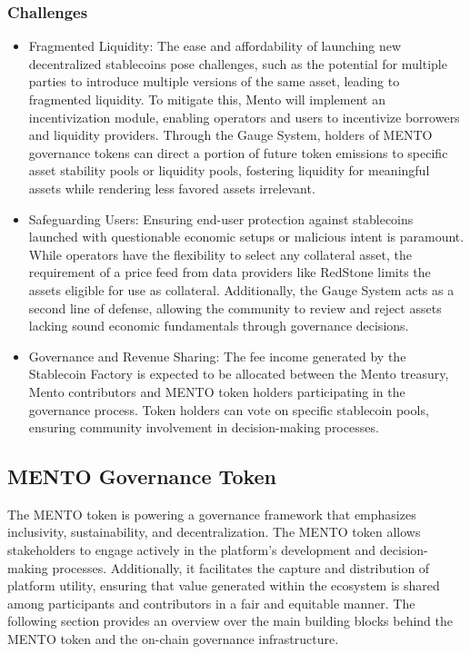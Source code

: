 \documentclass[a4paper]{article}
\theoremstyle{definition}
\begin{document}
\subsubsection{Challenges}
\begin{itemize}
    \item Fragmented Liquidity: The ease and affordability of launching new decentralized stablecoins pose challenges, such as the potential for multiple parties to introduce multiple versions of the same asset, leading to fragmented liquidity. To mitigate this, Mento will implement an incentivization module, enabling operators and users to incentivize borrowers and liquidity providers. Through the Gauge System, holders of MENTO governance tokens can direct a portion of future token emissions to specific asset stability pools or liquidity pools, fostering liquidity for meaningful assets while rendering less favored 
    assets irrelevant.
    \item Safeguarding Users: Ensuring end-user protection against stablecoins launched with questionable economic setups or malicious intent is paramount. While operators have the flexibility to select any collateral asset, the requirement of a price feed from data providers like RedStone limits the assets eligible for use as collateral. Additionally, the Gauge System acts as a second line of defense, allowing the community to review and reject assets lacking sound economic fundamentals through governance decisions.
    \item Governance and Revenue Sharing: The fee income generated by the Stablecoin Factory is expected to be allocated between the Mento treasury, Mento contributors and MENTO token holders participating in the governance process. Token holders can vote on specific stablecoin pools, ensuring community involvement in decision-making processes.
\end{itemize}

\subsection{ MENTO Governance Token}
The MENTO token is powering a governance framework that emphasizes inclusivity, sustainability, and decentralization. The MENTO token allows stakeholders to engage actively in the platform's development and decision-making processes. Additionally, it facilitates the capture and distribution of platform utility, ensuring that value generated within the ecosystem is shared among participants and contributors in a fair and equitable manner. The following section provides an overview over the main building blocks behind the MENTO token and the on-chain governance infrastructure.
\end{document}
